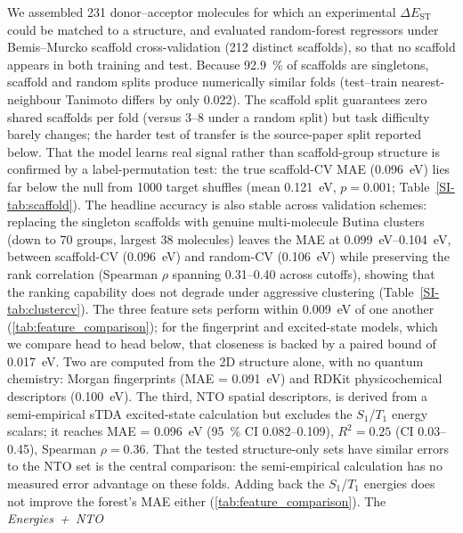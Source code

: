 We assembled \num{231} donor--acceptor molecules for which an experimental
$\Delta E_\text{ST}$ could be matched to a structure, and evaluated random-forest
regressors under Bemis--Murcko scaffold cross-validation (\num{212} distinct
scaffolds), so that no scaffold appears in both training and test.
Because \qty{92.9}{\percent} of scaffolds are singletons, scaffold and random splits
produce numerically similar folds (test--train nearest-neighbour Tanimoto differs by
only \num{0.022}). The scaffold split guarantees zero shared scaffolds per fold
(versus \numrange{3}{8} under a random split) but task difficulty barely changes;
the harder test of transfer is the source-paper split reported below.
That the model learns real signal rather than
scaffold-group structure is confirmed by a label-permutation test: the true
scaffold-CV MAE (\qty{0.096}{\electronvolt}) lies far below the null from
\num{1000} target shuffles (mean \qty{0.121}{\electronvolt}, $p = 0.001$;
Table~\ref{SI-tab:scaffold}).
The headline accuracy is also stable across validation schemes: replacing the singleton
scaffolds with genuine multi-molecule Butina clusters (down to \num{70} groups, largest
\num{38} molecules) leaves the MAE at \qtyrange{0.099}{0.104}{\electronvolt}, between
scaffold-CV (\qty{0.096}{\electronvolt}) and random-CV (\qty{0.106}{\electronvolt})
while preserving the rank correlation (Spearman $\rho$ spanning \numrange{0.31}{0.40} across cutoffs), showing that the ranking capability does not degrade under aggressive clustering
(Table~\ref{SI-tab:clustercv}).
The three feature sets perform within \qty{0.009}{\electronvolt} of one another
(\cref{tab:feature_comparison}); for the fingerprint and excited-state models, which we
compare head to head below, that closeness is backed by a paired bound of
\qty{0.017}{\electronvolt}. Two are computed from the 2D structure alone, with
no quantum chemistry: Morgan fingerprints (MAE = \qty{0.091}{\electronvolt}) and
RDKit physicochemical descriptors (\qty{0.100}{\electronvolt}). The third, NTO spatial
descriptors, is derived from a semi-empirical sTDA excited-state calculation but
excludes the $S_1$/$T_1$ energy scalars; it reaches MAE = \qty{0.096}{\electronvolt}
(\qty{95}{\percent} CI \numrange{0.082}{0.109}), $R^2 = 0.25$ (CI
\numrange{0.03}{0.45}), Spearman $\rho = 0.36$.
That the tested structure-only sets have similar errors to the NTO set is the
central comparison: the semi-empirical calculation has no measured error
advantage on these folds. Adding back the $S_1$/$T_1$ energies does not improve
the forest's MAE either (\cref{tab:feature_comparison}). The \emph{Energies~+~NTO}
